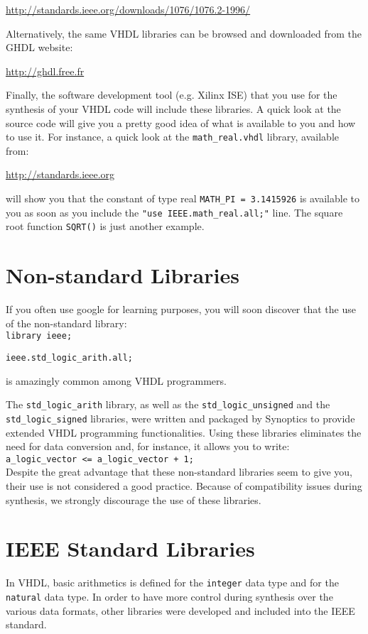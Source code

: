 \noindent
\url{http://standards.ieee.org/downloads/1076/1076.2-1996/}

\noindent
Alternatively, the same VHDL libraries can be browsed and downloaded from the GHDL website:

\noindent
\url{http://ghdl.free.fr}

\noindent
Finally, the software development tool (e.g. Xilinx ISE) that you use for the synthesis of your VHDL code will include these libraries. A quick look at the source code will give you a pretty good idea of what is available to you and how to use it. For instance, a quick look at the \texttt{math\_real.vhdl} library, available from: 

\noindent
\url{http://standards.ieee.org}

\noindent
will show you that the constant of type real \texttt{MATH\_PI = 3.1415926} is available to you as soon as you include the \texttt{"use IEEE.math\_real.all;"} line. The square root function \texttt{SQRT()} is just another example.

\section{Non-standard Libraries}
If {you often use google for learning purposes}, you will soon discover that the use of the non-standard library:\\
\texttt{library ieee;}

\noindent
\texttt{ieee.std\_logic\_arith.all;}

\noindent
is amazingly common among VHDL programmers. 

The \texttt{std\_logic\_arith} library, as well as the \texttt{std\_logic\_unsigned} and the \texttt{std\_logic\_signed} libraries, were written and packaged by Synoptics to provide extended VHDL programming functionalities. Using these libraries eliminates the need for data conversion and, for instance, it allows you to write:\\
\texttt{a\_logic\_vector <= a\_logic\_vector + 1;}\\
Despite the great advantage that these non-standard libraries seem to give you, their use is not considered a good practice. Because of compatibility issues during synthesis, we strongly discourage the use of these libraries.

\section{IEEE Standard Libraries}
In VHDL, basic arithmetics is defined for the \texttt{integer} data type and for the \texttt{natural} data type. In order to have more control during synthesis over the various data formats, other libraries were developed and included into the IEEE standard.

